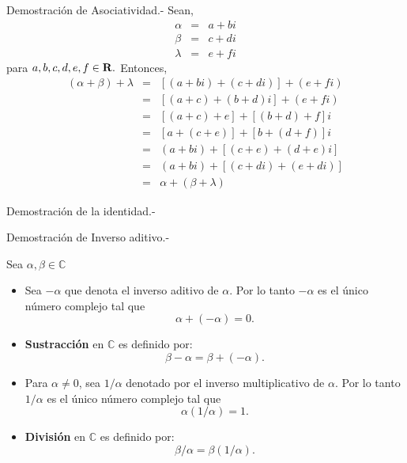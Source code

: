 Demostración de Asociatividad.-\; Sean,
$$\begin{array}{rcl}
    \alpha & = & a+bi\\
    \beta & = & c+di\\
    \lambda & = & e+fi
\end{array}$$
para $a,b,c,d,e,f \in \bf{R}.$ Entonces,
$$\begin{array}{rcl}
    (\alpha + \beta )+\lambda & = & \left[(a+bi)+(c+di)\right]+(e+fi)\\
			      & = & \left[(a+c)+(b+d)i\right] + (e+fi)\\
			      & = & \left[(a+c)+e\right]+\left[(b+d)+f\right]i\\
			      & = & \left[a+(c+e)\right]+\left[b+(d+f)\right]i\\
			      & = & (a+bi) + \left[(c+e)+(d+e)i\right]\\
			      & = & (a+bi) + \left[(c+di)+(e+di)\right]\\
			      & = & \alpha + (\beta + \lambda)
\end{array}$$
\vspace{0.5cm}

Demostración de la identidad.-\; 

Demostración de Inverso aditivo.-\; 


\begin{tcolorbox}
    \begin{def.} 
	Sea $\alpha, \beta \in \mathbb{C}$
	\begin{itemize}
	    \item Sea $-\alpha$ que denota el inverso aditivo de $\alpha$. Por lo tanto $-\alpha$ es el único número complejo tal que 
		$$\alpha + (-\alpha) = 0.$$

	    \item \textbf{Sustracción} en $\mathbb{C}$ es definido por:
		$$\beta - \alpha = \beta + (-\alpha).$$

	    \item Para $\alpha\neq 0$, sea $1/\alpha$ denotado por el inverso multiplicativo de $\alpha$. Por lo tanto $1/\alpha$ es el único número complejo tal que
		$$\alpha (1/\alpha)=1.$$

	    \item \textbf{División} en $\mathbb{C}$ es definido por:
		$$\beta/\alpha = \beta(1/\alpha).$$
	\end{itemize}
    \end{def.}
\end{tcolorbox}

